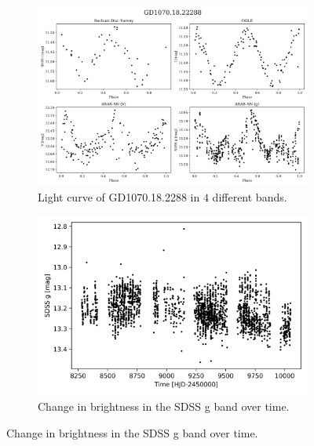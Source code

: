\documentclass{pracalicmgr}
\begin{document}
\begin{figure}%
    \centering
    \begin{subfigure}{1\textwidth}
       \includegraphics[width=1\linewidth]{plots/GD1070.18.22288/lc_comparsion.png}
       \caption{Light curve of GD1070.18.2288 in $4$ different bands.}\label{comp}
       \label{fig:Ng1} 
    \end{subfigure}
    
    \begin{subfigure}{1\textwidth}
       \includegraphics[width=1\linewidth]{plots/GD1070.18.22288/visibility_over_time.png}
       \caption{Change in brightness in the SDSS g band over time.}\label{evolution}
    \end{subfigure}
\end{figure}
\end{document}
